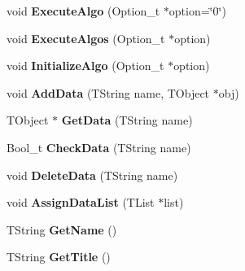 \begin{DoxyCompactItemize}
\item 
\hypertarget{class_h_a_l_1_1_algorithm_a64a01d69f068ef29f19057d9f4c1b172}{void {\bfseries Execute\-Algo} (Option\-\_\-t $\ast$option=\char`\"{}0\char`\"{})}\label{class_h_a_l_1_1_algorithm_a64a01d69f068ef29f19057d9f4c1b172}

\item 
\hypertarget{class_h_a_l_1_1_algorithm_aaf9d9ecdf99c327ec4de93cd5930d3c4}{void {\bfseries Execute\-Algos} (Option\-\_\-t $\ast$option)}\label{class_h_a_l_1_1_algorithm_aaf9d9ecdf99c327ec4de93cd5930d3c4}

\item 
\hypertarget{class_h_a_l_1_1_algorithm_aeb9b42850a64b3c25e7035e04c68a508}{void {\bfseries Initialize\-Algo} (Option\-\_\-t $\ast$option)}\label{class_h_a_l_1_1_algorithm_aeb9b42850a64b3c25e7035e04c68a508}

\item 
\hypertarget{class_h_a_l_1_1_algorithm_a7fd35cf6dc1962b58e48905b178c1747}{void {\bfseries Add\-Data} (T\-String name, T\-Object $\ast$obj)}\label{class_h_a_l_1_1_algorithm_a7fd35cf6dc1962b58e48905b178c1747}

\item 
\hypertarget{class_h_a_l_1_1_algorithm_ae9b228550b42524824f7119604df1add}{T\-Object $\ast$ {\bfseries Get\-Data} (T\-String name)}\label{class_h_a_l_1_1_algorithm_ae9b228550b42524824f7119604df1add}

\item 
\hypertarget{class_h_a_l_1_1_algorithm_a6609ea9ac6dbc42adb5b110a41201c9a}{Bool\-\_\-t {\bfseries Check\-Data} (T\-String name)}\label{class_h_a_l_1_1_algorithm_a6609ea9ac6dbc42adb5b110a41201c9a}

\item 
\hypertarget{class_h_a_l_1_1_algorithm_af0211270f880699c5a260754bbaa9640}{void {\bfseries Delete\-Data} (T\-String name)}\label{class_h_a_l_1_1_algorithm_af0211270f880699c5a260754bbaa9640}

\item 
\hypertarget{class_h_a_l_1_1_algorithm_aaae65cc70d75b35bbf4a4c987ee5fb46}{void {\bfseries Assign\-Data\-List} (T\-List $\ast$list)}\label{class_h_a_l_1_1_algorithm_aaae65cc70d75b35bbf4a4c987ee5fb46}

\item 
\hypertarget{class_h_a_l_1_1_algorithm_a0a3b6fa6eb3cf0063187c2b442f64ae8}{T\-String {\bfseries Get\-Name} ()}\label{class_h_a_l_1_1_algorithm_a0a3b6fa6eb3cf0063187c2b442f64ae8}

\item 
\hypertarget{class_h_a_l_1_1_algorithm_a9245bfda990ffdbde86cc56bcacd5b72}{T\-String {\bfseries Get\-Title} ()}\label{class_h_a_l_1_1_algorithm_a9245bfda990ffdbde86cc56bcacd5b72}

\end{DoxyCompactItemize}
